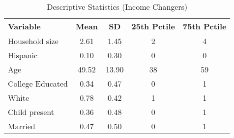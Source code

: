 \begin{table}[!htbp] \centering
\caption{Descriptive Statistics (Income Changers)}
\label{tab:homescanSummaryStatsChanger}
\begin{tabular}{lcccc}
\hline
Variable                  & Mean  & SD    & 25th Pctile & 75th Pctile\\
\hline
Household size            & 2.61  & 1.45  & 2           & 4 \\
Hispanic                  & 0.10  & 0.30  & 0           & 0 \\
Age                       & 49.52 & 13.90 & 38        & 59 \\
College Educated          & 0.34  & 0.47  & 0           & 1 \\
White                     & 0.78  & 0.42  & 1           & 1\\
Child present             & 0.36  & 0.48  & 0           & 1\\
Married                   & 0.47  & 0.50  & 0           & 1\\
\hline
\hline
\end{tabular}
\end{table}
